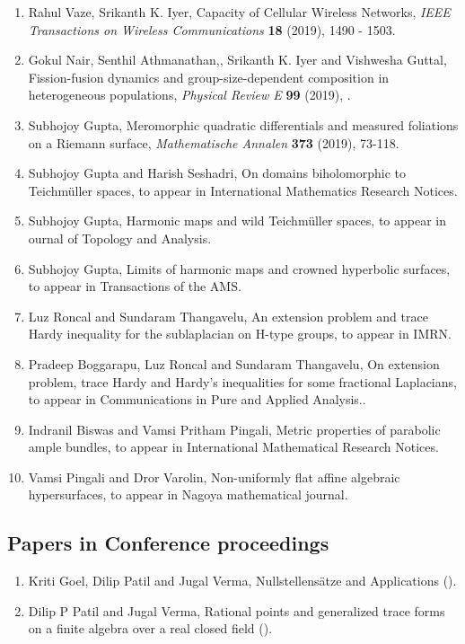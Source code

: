 \begin{enumerate}
\item Rahul Vaze, Srikanth K. Iyer, Capacity of Cellular Wireless Networks, {\em IEEE Transactions on Wireless Communications} {\bf 18} (2019), 1490 - 1503.
\item Gokul Nair, Senthil Athmanathan,, Srikanth K. Iyer  and Vishwesha Guttal, Fission-fusion dynamics and group-size-dependent composition in heterogeneous populations, {\em Physical Review E} {\bf 99} (2019), .
\item Subhojoy Gupta, Meromorphic quadratic differentials and measured foliations on a Riemann surface, {\em Mathematische Annalen} {\bf 373} (2019), 73-118.
\item Subhojoy Gupta and Harish Seshadri, On domains biholomorphic to Teichmüller spaces, to appear in International Mathematics Research Notices.
\item Subhojoy Gupta, Harmonic maps and wild Teichmüller spaces, to appear in ournal of Topology and Analysis.
\item Subhojoy Gupta, Limits of harmonic maps and crowned hyperbolic surfaces, to appear in Transactions of the AMS.
\item Luz Roncal and Sundaram Thangavelu, An extension problem and trace Hardy inequality for the sublaplacian on H-type groups, to appear in IMRN.
\item Pradeep Boggarapu, Luz Roncal and Sundaram Thangavelu, On extension problem, trace Hardy and Hardy's inequalities for some fractional Laplacians, to appear in Communications in Pure and Applied Analysis..
\item Indranil Biswas and Vamsi Pritham Pingali, Metric properties of parabolic ample bundles, to appear in International Mathematical Research Notices.
\item Vamsi Pingali and Dror Varolin, Non-uniformly flat affine algebraic hypersurfaces, to appear in Nagoya mathematical journal.
\end{enumerate}

\subsection{Papers in Conference proceedings}

\begin{enumerate}
\item Kriti Goel, Dilip Patil and Jugal Verma, Nullstellens\"atze and Applications {\em } ().
\item Dilip P Patil and Jugal Verma, Rational points and generalized trace forms on a finite algebra over a real closed field {\em } ().
\end{enumerate}

